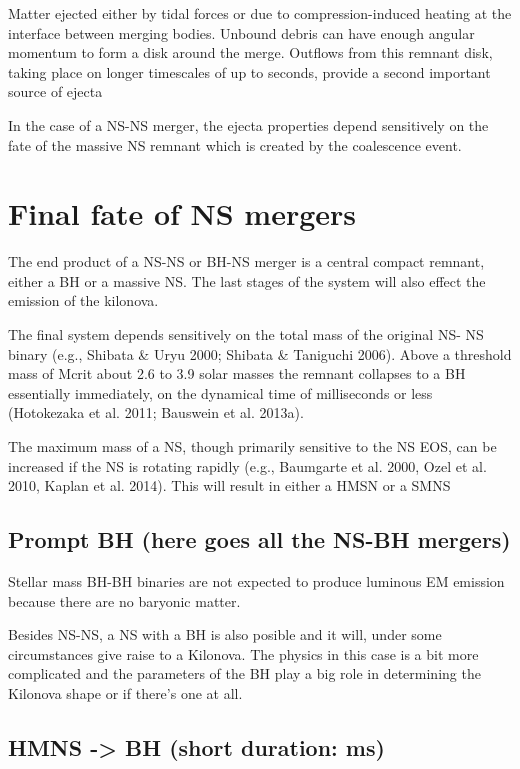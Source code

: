Matter ejected either by tidal forces or due to compression-induced heating at the interface between merging bodies.
Unbound debris can have enough angular momentum to form a disk around the merge.
Outflows from this remnant disk, taking place on longer timescales of up to seconds, provide a second important source of ejecta

In the case of a NS-NS merger, the ejecta properties depend sensitively on the fate of the massive NS remnant which is created by the coalescence event.

\section{Final fate of NS mergers}

The end product of a NS-NS or BH-NS merger is a central compact remnant, either a BH or a massive NS. 
The last stages of the system will also effect the emission of the kilonova.

The final system depends sensitively on the total mass of the original NS- NS binary (e.g., Shibata \& Uryu 2000; Shibata \& Taniguchi 2006). Above a threshold mass of Mcrit about 2.6 to 3.9 solar masses the remnant collapses to a BH essentially immediately, on the dynamical time of milliseconds or less (Hotokezaka et al. 2011; Bauswein et al. 2013a).

The maximum mass of a NS, though primarily sensitive to the NS EOS, can be increased if the NS is rotating rapidly (e.g., Baumgarte et al. 2000, Ozel et al. 2010, Kaplan et al. 2014). This will result in either a HMSN or a SMNS

\subsection{Prompt BH (here goes all the NS-BH mergers)}

Stellar mass BH-BH binaries are not expected to produce luminous EM emission because there are no baryonic matter.

Besides NS-NS, a NS with a BH is also posible and it will, under some circumstances give raise to a Kilonova. The physics in this case is a bit more complicated and the parameters of the BH play a big role in determining the Kilonova shape or if there's one at all.

\subsection{HMNS -> BH (short duration: ms)}

